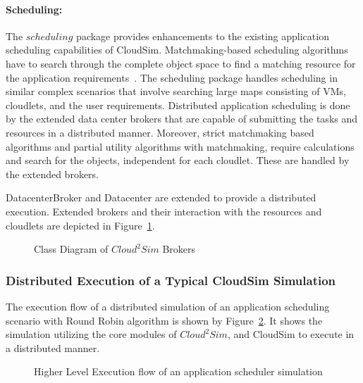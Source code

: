 \paragraph*{Scheduling:}
The $scheduling$ package provides enhancements to the existing application scheduling capabilities of CloudSim. Matchmaking-based scheduling algorithms have to search through the complete object space to find a matching resource for the application requirements~\cite{mm,mm2}. The scheduling package handles scheduling in similar complex scenarios that involve searching large maps consisting of VMs, cloudlets, and the user requirements. Distributed application scheduling is done by the extended data center brokers that are capable of submitting the tasks and resources in a distributed manner. Moreover, strict matchmaking based algorithms and partial utility algorithms with matchmaking, require calculations and search for the objects, independent for each cloudlet. These are handled by the extended brokers.

DatacenterBroker and Datacenter are extended to provide a distributed execution. Extended brokers and their interaction with the resources and cloudlets are depicted in Figure~\ref{fig:classDiagram}.

\begin{figure}[!htbp]
\begin{center}
\end{center}
 \caption{Class Diagram of $Cloud^{2}Sim$ Brokers}
 \label{fig:classDiagram}
\end{figure}

\subsubsection{Distributed Execution of a Typical CloudSim Simulation}
The execution flow of a distributed simulation of an application scheduling scenario with Round Robin algorithm is shown by Figure~\ref{fig:flowmin}. It shows the simulation utilizing the core modules of $Cloud^{2}Sim$, and CloudSim to execute in a distributed manner. 
\begin{figure}[!h]
\begin{center}
\end{center}
 \caption{Higher Level Execution flow of an application scheduler simulation}
 \label{fig:flowmin}
\end{figure}

